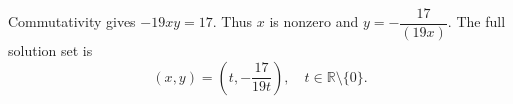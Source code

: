 Commutativity gives $-19xy=17$. Thus $x$ is nonzero and $y=-\dfrac{17}{(19x)}$. The full solution set is
\[
\boxed{(x,y)=\left(t,-\dfrac{17}{19t}\right),\quad t\in\mathbb R\setminus\{0\}}.
\]
